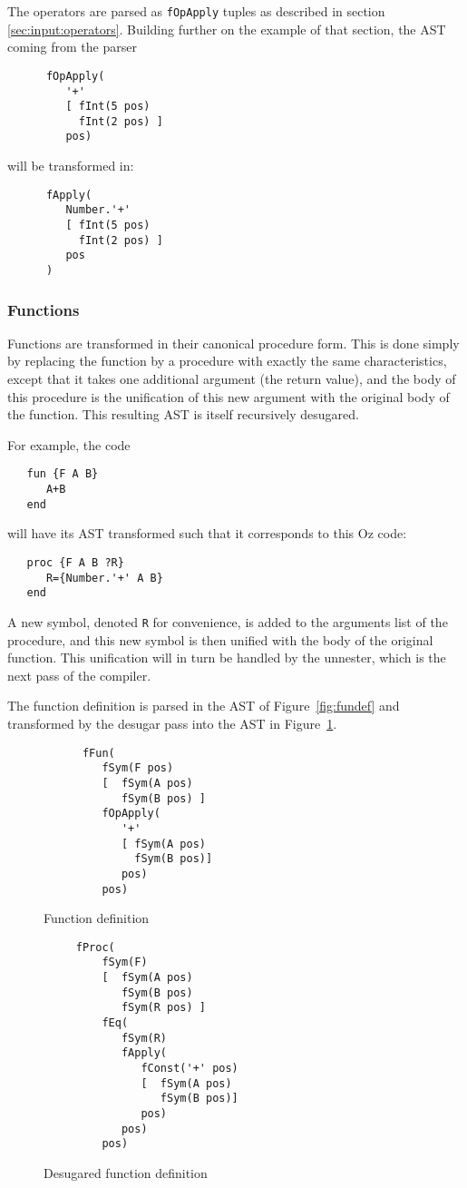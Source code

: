 \documentclass[a4paper]{memoir}
\begin{document}
The operators are parsed as \lstinline!fOpApply! tuples as described in section \ref{sec:input:operators}. Building further on the example of that section, the AST coming from the parser

\begin{verbatim}
      fOpApply(
         '+'
         [ fInt(5 pos)
           fInt(2 pos) ]
         pos)
\end{verbatim}
will be transformed in:
\begin{verbatim}
      fApply(
         Number.'+'
         [ fInt(5 pos)
           fInt(2 pos) ]
         pos
      )
\end{verbatim}

\subsubsection{Functions}\label{sec:arch:desugar:functions}
Functions are transformed in their canonical procedure form. This is done simply by replacing the function by a procedure with exactly the same characteristics, except that it takes one additional argument (the return value), and the body of this procedure is the unification of this new argument with the original body of the function. This resulting AST is itself recursively desugared.

For example, the code
\begin{lstlisting}
   fun {F A B}
      A+B
   end

\end{lstlisting} 
will have its AST transformed such that it corresponds to this Oz code:
\begin{lstlisting}
   proc {F A B ?R}
      R={Number.'+' A B}
   end
\end{lstlisting} 
A new symbol, denoted \lstinline!R! for convenience, is added to the arguments list of the procedure, and this new symbol is then unified with the body of the original function. This unification will in turn be handled by the unnester, which is the next pass of the compiler.


The function definition is parsed in the AST of Figure~\ref{fig:fundef} 
and transformed by the desugar pass into the AST in Figure~\ref{fig:fundesugar}.
\begin{figure}[h]
\begin{verbatim}
      fFun(
         fSym(F pos)
         [  fSym(A pos)
            fSym(B pos) ]
         fOpApply(
            '+'
            [ fSym(A pos)
              fSym(B pos)]
            pos)
         pos)
\end{verbatim}
\caption{Function definition}
\label{fig:fundef}
\begin{verbatim}
     fProc(     
         fSym(F)
         [  fSym(A pos)
            fSym(B pos)
            fSym(R pos) ]
         fEq(
            fSym(R)
            fApply(
               fConst('+' pos)
               [  fSym(A pos)
                  fSym(B pos)]
               pos)
            pos)
         pos)
\end{verbatim}
\caption{Desugared function definition}
\label{fig:fundesugar}
\end{figure}
\end{document}

